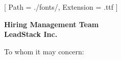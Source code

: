 


\renewcommand{\photo}[2]{}

\geometry{
  left=2cm,
  right=2cm,
  top=2cm,
  bottom=2cm
}



\makecvheader

\setmainfont{NotoSans-Regular}[
  Path = ./fonts/,
  Extension = .ttf
]

\vspace{1cm}
\indent\textbf{Hiring Management Team}\\
\indent\textbf{LeadStack Inc.}

\vspace{0.5cm}

\noindent To whom it may concern:

\vspace{0.5cm}


